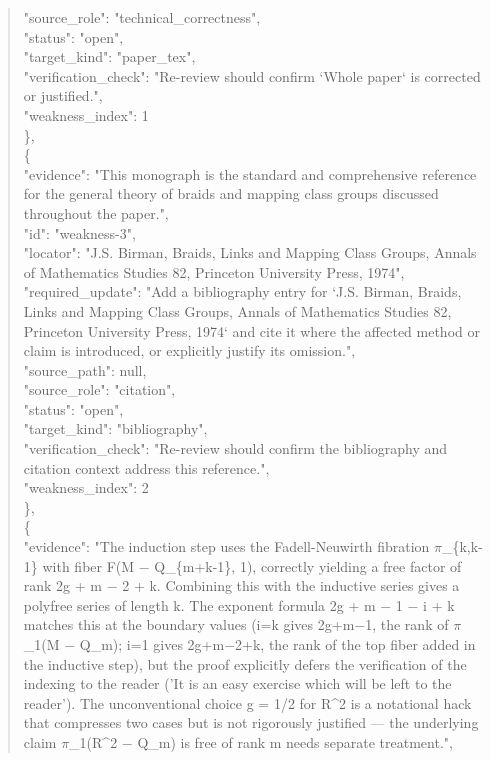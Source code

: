 \documentclass[11pt]{article}
\begin{document}
\begin{quote}
      "source\_role": "technical\_correctness",\\
      "status": "open",\\
      "target\_kind": "paper\_tex",\\
      "verification\_check": "Re-review should confirm `Whole paper` is corrected or justified.",\\
      "weakness\_index": 1\\
    \},\\
    \{\\
      "evidence": "This monograph is the standard and comprehensive reference for the general theory of braids and mapping class groups discussed throughout the paper.",\\
      "id": "weakness-3",\\
      "locator": "J.S. Birman, Braids, Links and Mapping Class Groups, Annals of Mathematics Studies 82, Princeton University Press, 1974",\\
      "required\_update": "Add a bibliography entry for `J.S. Birman, Braids, Links and Mapping Class Groups, Annals of Mathematics Studies 82, Princeton University Press, 1974` and cite it where the affected method or claim is introduced, or explicitly justify its omission.",\\
      "source\_path": null,\\
      "source\_role": "citation",\\
      "status": "open",\\
      "target\_kind": "bibliography",\\
      "verification\_check": "Re-review should confirm the bibliography and citation context address this reference.",\\
      "weakness\_index": 2\\
    \},\\
    \{\\
      "evidence": "The induction step uses the Fadell-Neuwirth fibration \ensuremath{\pi}\_\{k,k-1\} with fiber F(M \ensuremath{-} Q\_\{m+k-1\}, 1), correctly yielding a free factor of rank 2g + m \ensuremath{-} 2 + k. Combining this with the inductive series gives a polyfree series of length k. The exponent formula 2g + m \ensuremath{-} 1 \ensuremath{-} i + k matches this at the boundary values (i=k gives 2g+m\ensuremath{-}1, the rank of \ensuremath{\pi}\_1(M \ensuremath{-} Q\_m); i=1 gives 2g+m\ensuremath{-}2+k, the rank of the top fiber added in the inductive step), but the proof explicitly defers the verification of the indexing to the reader ('It is an easy exercise which will be left to the reader'). The unconventional choice g = 1/2 for R\^{}2 is a notational hack that compresses two cases but is not rigorously justified --- the underlying claim \ensuremath{\pi}\_1(R\^{}2 \ensuremath{-} Q\_m) is free of rank m needs separate treatment.",\\

\end{quote}
\end{document}
